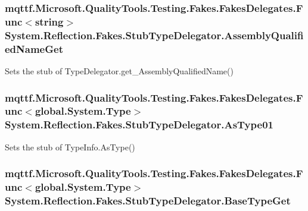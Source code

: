 \hypertarget{class_system_1_1_reflection_1_1_fakes_1_1_stub_type_delegator_a543d40dc10ef7aa918544103928673f1}{
\subsubsection[{Assembly\-Qualified\-Name\-Get}]{\setlength{\rightskip}{0pt plus 5cm}mqttf.\-Microsoft.\-Quality\-Tools.\-Testing.\-Fakes.\-Fakes\-Delegates.\-Func$<$string$>$ System.\-Reflection.\-Fakes.\-Stub\-Type\-Delegator.\-Assembly\-Qualified\-Name\-Get}}\label{class_system_1_1_reflection_1_1_fakes_1_1_stub_type_delegator_a543d40dc10ef7aa918544103928673f1}


Sets the stub of Type\-Delegator.\-get\-\_\-\-Assembly\-Qualified\-Name()

\hypertarget{class_system_1_1_reflection_1_1_fakes_1_1_stub_type_delegator_a22310d78e6da5878cb933d49fde3e931}{
\subsubsection[{As\-Type01}]{\setlength{\rightskip}{0pt plus 5cm}mqttf.\-Microsoft.\-Quality\-Tools.\-Testing.\-Fakes.\-Fakes\-Delegates.\-Func$<$global.\-System.\-Type$>$ System.\-Reflection.\-Fakes.\-Stub\-Type\-Delegator.\-As\-Type01}}\label{class_system_1_1_reflection_1_1_fakes_1_1_stub_type_delegator_a22310d78e6da5878cb933d49fde3e931}


Sets the stub of Type\-Info.\-As\-Type()

\hypertarget{class_system_1_1_reflection_1_1_fakes_1_1_stub_type_delegator_aee2eccbc78774fc5319d9e2f9d0a68b4}{
\subsubsection[{Base\-Type\-Get}]{\setlength{\rightskip}{0pt plus 5cm}mqttf.\-Microsoft.\-Quality\-Tools.\-Testing.\-Fakes.\-Fakes\-Delegates.\-Func$<$global.\-System.\-Type$>$ System.\-Reflection.\-Fakes.\-Stub\-Type\-Delegator.\-Base\-Type\-Get}}\label{class_system_1_1_reflection_1_1_fakes_1_1_stub_type_delegator_aee2eccbc78774fc5319d9e2f9d0a68b4}


